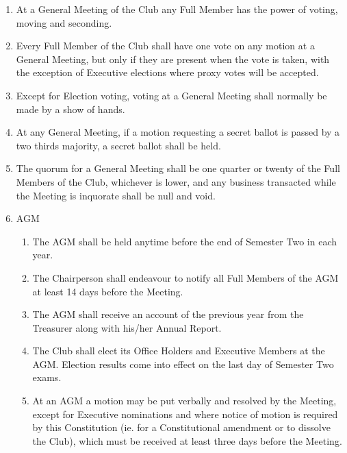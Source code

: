 \documentclass[a4paper]{article}
\begin{document}
	\begin{enumerate}
		\item At a General Meeting of the Club any Full Member has the power of voting, moving and seconding.
		
		\item Every Full Member of the Club shall have one vote on any motion at a General Meeting, but only if they are present when the vote is taken, with the exception of Executive elections where proxy votes will be accepted.
		
		\item Except for Election voting, voting at a General Meeting shall normally be made by a show of hands.
		
		\item At any General Meeting, if a motion requesting a secret ballot is passed by a two thirds majority, a secret ballot shall be held.
		
		\item The quorum for a General Meeting shall be one quarter or twenty of the Full Members of the Club, whichever is lower, and any business transacted while the Meeting is inquorate shall be null and void.
		
		\item \acf{AGM}
		\begin{enumerate}
			\item The \ac{AGM} shall be held anytime before the end of Semester Two in each year.
			
			\item The Chairperson shall endeavour to notify all Full Members of the \ac{AGM} at least 14 days before the Meeting.
			
			\item The \ac{AGM} shall receive an account of the previous year from the Treasurer along with his/her Annual Report.
			
			\item The Club shall elect its Office Holders and Executive Members at the \ac{AGM}. Election results come into effect on the last day of Semester Two exams.
			
			\item At an \ac{AGM} a motion may be put verbally and resolved by the Meeting, except for Executive nominations and where notice of motion is required by this Constitution (ie. for a Constitutional amendment or to dissolve the Club), which must be received at least three days before the Meeting.
		\end{enumerate}
	

\end{enumerate}
\end{document}
